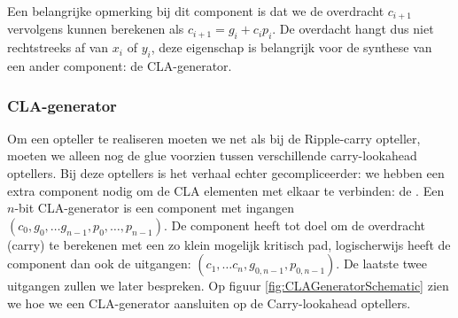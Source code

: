 Een belangrijke opmerking bij dit component is dat we de overdracht $c_{i+1}$ vervolgens kunnen berekenen als $c_{i+1}=g_i+c_ip_i$. De overdacht hangt dus niet rechtstreeks af van $x_i$ of $y_i$, deze eigenschap is belangrijk voor de synthese van een ander component: de CLA-generator.
\subsubsection{CLA-generator}
Om een opteller te realiseren moeten we net als bij de Ripple-carry opteller, moeten we alleen nog de glue voorzien tussen verschillende carry-lookahead optellers. Bij deze optellers is het verhaal echter gecompliceerder: we hebben een extra component nodig om de CLA elementen met elkaar te verbinden: de . Een $n$-bit CLA-generator is een component met ingangen $\left(c_0,g_0,\ldots g_{n-1},p_0,\ldots,p_{n-1}\right)$. De component heeft tot doel om de overdracht (carry) te berekenen met een zo klein mogelijk kritisch pad, logischerwijs heeft de component dan ook de uitgangen: $\left(c_1,\ldots c_n,g_{0,n-1},p_{0,n-1}\right)$. De laatste twee uitgangen zullen we later bespreken. Op figuur \ref{fig:CLAGeneratorSchematic} zien we hoe we een CLA-generator aansluiten op de Carry-lookahead optellers.
